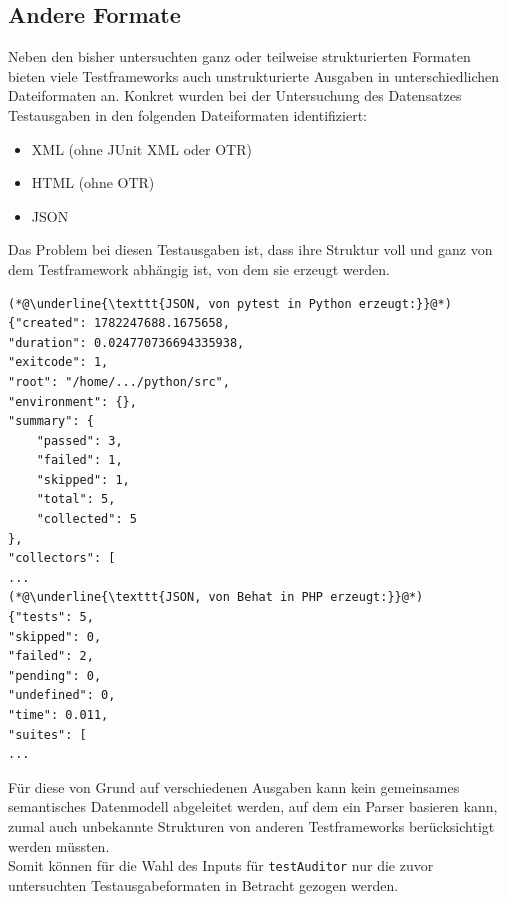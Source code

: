 \subsection{Andere Formate}
Neben den bisher untersuchten ganz oder teilweise strukturierten Formaten bieten viele Testframeworks auch unstrukturierte Ausgaben in unterschiedlichen Dateiformaten an. Konkret wurden bei der Untersuchung des Datensatzes Testausgaben in den folgenden Dateiformaten identifiziert:
\begin{itemize}
    \item XML (ohne JUnit XML oder OTR)
    \item HTML (ohne OTR)
    \item JSON
\end{itemize}
Das Problem bei diesen Testausgaben ist, dass ihre Struktur voll und ganz von dem Testframework abhängig ist, von dem sie erzeugt werden. 

\begin{lstlisting}[caption={Vergleich der JSON-Ausgabe von pytest und Behat.\\ ''\textellipsis{}'' bezeichnet gekürzte Stellen.}, label={JSON_example}]
(*@\underline{\texttt{JSON, von pytest in Python erzeugt:}}@*)
{"created": 1782247688.1675658,
"duration": 0.024770736694335938,
"exitcode": 1,
"root": "/home/.../python/src",
"environment": {},
"summary": {
    "passed": 3,
    "failed": 1,
    "skipped": 1,
    "total": 5,
    "collected": 5
},
"collectors": [
...
(*@\underline{\texttt{JSON, von Behat in PHP erzeugt:}}@*)
{"tests": 5,
"skipped": 0,
"failed": 2,
"pending": 0,
"undefined": 0,
"time": 0.011,
"suites": [
...
\end{lstlisting}

Für diese von Grund auf verschiedenen Ausgaben kann kein gemeinsames semantisches Datenmodell abgeleitet werden, auf dem ein Parser basieren kann, zumal auch unbekannte Strukturen von anderen Testframeworks berücksichtigt werden müssten.\\
Somit können für die Wahl des Inputs für \texttt{testAuditor} nur die zuvor untersuchten Testausgabeformaten in Betracht gezogen werden. 


